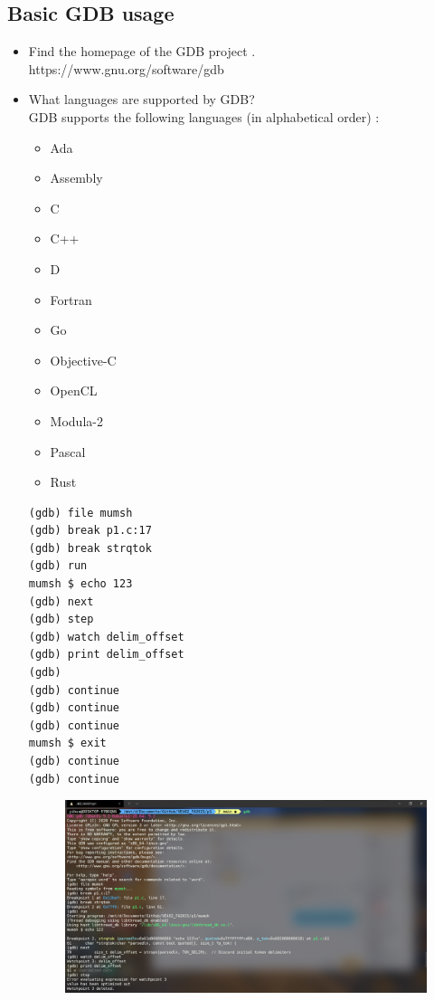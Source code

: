 \documentclass[a4paper]{article}
\begin{document}
\subsection{Basic GDB usage}
\begin{itemize}
    \item Find the homepage of the GDB project \cite{gdb}.\\
    https://www.gnu.org/software/gdb
    \item What languages are supported by GDB?\\
    GDB supports the following languages (in alphabetical order) \cite{gdb}:
    \begin{itemize}
        \item Ada
        \item Assembly
        \item C
        \item C++
        \item D
        \item Fortran
        \item Go
        \item Objective-C
        \item OpenCL
        \item Modula-2
        \item Pascal
        \item Rust
    \end{itemize}
    \begin{verbatim}
(gdb) file mumsh
(gdb) break p1.c:17
(gdb) break strqtok
(gdb) run
mumsh $ echo 123
(gdb) next
(gdb) step
(gdb) watch delim_offset
(gdb) print delim_offset
(gdb) 
(gdb) continue
(gdb) continue
(gdb) continue
mumsh $ exit
(gdb) continue
(gdb) continue
    \end{verbatim}
    \begin{figure}[H]
        \centering
        \includegraphics[width=1\textwidth]{10.png}

\end{figure}
\end{itemize}
\end{document}
